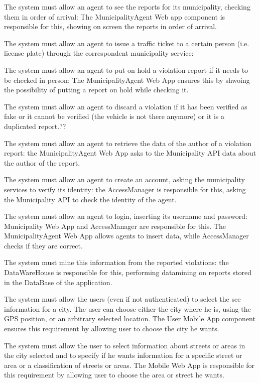 \documentclass[a4paper]{report}
\begin{document}
\begin{enumerate}[start=1,label={[R\arabic*]}]
\item The system must allow an agent to see the reports for its municipality, checking them in order of arrival: The MunicipalityAgent Web app component is responsible for this, showing on screen the reports in order of arrival.
\item The system must allow an agent to issue a traffic ticket to a certain person (i.e. license plate) through the correspondent municipality service:
\item The system must allow an agent to put on hold a violation report if it needs to be checked in person: The MunicipalityAgent Web App ensures this by shwoing the possibility of putting a report on hold while checking it.
\item The system must allow an agent to discard a violation if it has been verified as fake or it cannot be verified (the vehicle is not there anymore) or it is a duplicated report.??
\item The system must allow an agent to retrieve the data of the author of a violation report: the MunicipalityAgent Web App asks to the Municipality API data about the author of the report. 
\item The system must allow an agent to create an account, asking the municipality services to verify its identity: the AccessManager is responsible for this, asking the Municipality API to check the identity of the agent.
\item The system must allow an agent to login, inserting its username and password: Municipality Web App and AccessManager are responsible for this. The MunicipalityAgent Web App allows agents to insert data, while AccessManager checks if they are correct.
\item The system must mine this information from the reported violations: the DataWareHouse is responsible for this, performing datamining on reports stored in the DataBase of the application.
\item The system must allow the users (even if not authenticated) to select the see information for a city. The user can choose either the city where he is, using the GPS position, or an arbitrary selected location. The User Mobile App component ensures this requirement by allowing user to choose the city he wants.
\item The system must allow the user to select information about streets or areas in the city selected and to specify if he wants information for a specific street or area or a classification of streets or areas. The Mobile Web App is responsible for this requirement by allowing user to choose the area or street he wants.

\end{enumerate}
\end{document}

